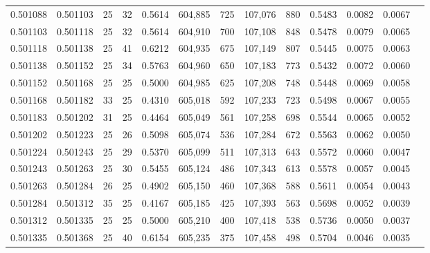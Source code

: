 \begin{tabular}{rrrrrrrrrrrrr}
0.501088 & 0.501103 &    25 &  32 &                                     0.5614 & 604,885 &     725 & 107,076 &     880 & 0.5483 & 0.0082 & 0.0067 \\
0.501103 & 0.501118 &    25 &  32 &                                     0.5614 & 604,910 &     700 & 107,108 &     848 & 0.5478 & 0.0079 & 0.0065 \\
0.501118 & 0.501138 &    25 &  41 &                                     0.6212 & 604,935 &     675 & 107,149 &     807 & 0.5445 & 0.0075 & 0.0063 \\
0.501138 & 0.501152 &    25 &  34 &                                     0.5763 & 604,960 &     650 & 107,183 &     773 & 0.5432 & 0.0072 & 0.0060 \\
0.501152 & 0.501168 &    25 &  25 &                                     0.5000 & 604,985 &     625 & 107,208 &     748 & 0.5448 & 0.0069 & 0.0058 \\
0.501168 & 0.501182 &    33 &  25 &                                     0.4310 & 605,018 &     592 & 107,233 &     723 & 0.5498 & 0.0067 & 0.0055 \\
0.501183 & 0.501202 &    31 &  25 &                                     0.4464 & 605,049 &     561 & 107,258 &     698 & 0.5544 & 0.0065 & 0.0052 \\
0.501202 & 0.501223 &    25 &  26 &                                     0.5098 & 605,074 &     536 & 107,284 &     672 & 0.5563 & 0.0062 & 0.0050 \\
0.501224 & 0.501243 &    25 &  29 &                                     0.5370 & 605,099 &     511 & 107,313 &     643 & 0.5572 & 0.0060 & 0.0047 \\
0.501243 & 0.501263 &    25 &  30 &                                     0.5455 & 605,124 &     486 & 107,343 &     613 & 0.5578 & 0.0057 & 0.0045 \\
0.501263 & 0.501284 &    26 &  25 &                                     0.4902 & 605,150 &     460 & 107,368 &     588 & 0.5611 & 0.0054 & 0.0043 \\
0.501284 & 0.501312 &    35 &  25 &                                     0.4167 & 605,185 &     425 & 107,393 &     563 & 0.5698 & 0.0052 & 0.0039 \\
0.501312 & 0.501335 &    25 &  25 &                                     0.5000 & 605,210 &     400 & 107,418 &     538 & 0.5736 & 0.0050 & 0.0037 \\
0.501335 & 0.501368 &    25 &  40 &                                     0.6154 & 605,235 &     375 & 107,458 &     498 & 0.5704 & 0.0046 & 0.0035 \\

\end{tabular}
